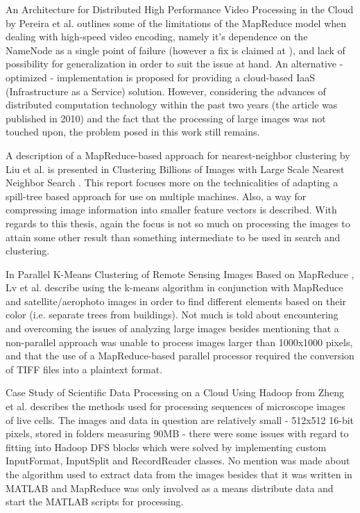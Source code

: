 \documentclass [12pt,a4paper]{report}
\begin{document}
An Architecture for Distributed High Performance Video Processing in the Cloud \cite{Pereira:2010:ADH:1844768.1845374} by Pereira et al. outlines some of the limitations of the MapReduce model when dealing with high-speed video encoding, namely it's dependence on the NameNode as a single point of failure (however a fix is claimed at \cite{website:facebook_namenode_improvements}), and lack of possibility for generalization in order to suit the issue at hand. An alternative - optimized - implementation is proposed for providing a cloud-based IaaS (Infrastructure as a Service) solution. However, considering the advances of distributed computation technology within the past two years (the article was published in 2010) and the fact that the processing of large images was not touched upon, the problem posed in this work still remains.

A description of a MapReduce-based approach for nearest-neighbor clustering by Liu et al. is presented in Clustering Billions of Images with Large Scale Nearest Neighbor Search \cite{citeulike:2631015}. This report focuses more on the technicalities of adapting a spill-tree based approach for use on multiple machines. Also, a way for compressing image information into smaller feature vectors is described. With regards to this thesis, again the focus is not so much on processing the images to attain some other result than something intermediate to be used in search and clustering.

In Parallel K-Means Clustering of Remote Sensing Images Based on MapReduce \cite{Lv:2010:PKC:1927661.1927687}, Lv et al. describe using the k-means algorithm in conjunction with MapReduce and satellite/aerophoto images in order to find different elements based on their color (i.e. separate trees from buildings). Not much is told about encountering and overcoming the issues of analyzing large images besides mentioning that a non-parallel approach was unable to process images larger than 1000x1000 pixels, and that the use of a MapReduce-based parallel processor required the conversion of TIFF files into a plaintext format.

Case Study of Scientific Data Processing on a Cloud Using Hadoop \cite{Zhang:2009:CSS:2127968.2128002} from Zheng et al. describes the methods used for processing sequences of microscope images of live cells. The images and data in question are relatively small - 512x512 16-bit pixels, stored in folders measuring 90MB - there were some issues with regard to fitting into Hadoop DFS blocks which were solved by implementing custom InputFormat, InputSplit and RecordReader classes. No mention was made about the algorithm used to extract data from the images besides that it was written in MATLAB and MapReduce was only involved as a means distribute data and start the MATLAB scripts for processing.
\end{document}
